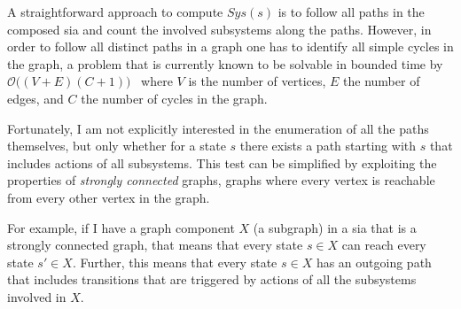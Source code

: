 A straightforward approach to compute $\mathit{Sys}(s)$ is to follow all paths in the composed \gls{sia} and count the involved subsystems along the paths.
However, in order to follow all distinct paths in a graph one has to identify all simple cycles in the graph, a problem that is currently known to be solvable in bounded time by $\mathcal{O}\big ( (V+E)(C+1)\big )$~\cite{johnson1975} where $V$ is the number of vertices, $E$ the number of edges, and $C$ the number of cycles in the graph.

Fortunately, I am not explicitly interested in the enumeration of all the paths themselves, but only whether for a state $s$ there exists a path starting with $s$ that includes actions of all subsystems.
This test can be simplified by exploiting the properties of \emph{strongly connected} graphs, \ie graphs where every vertex is reachable from every other vertex in the graph.

For example, if I have a graph component $X$ (\ie a subgraph) in a \gls{sia} that is a strongly connected graph, that means that every state $s \in X$ can reach every state $s' \in X$.
Further, this means that every state $s \in X$ has an outgoing path that includes transitions that are triggered by actions of all the subsystems involved in $X$.


